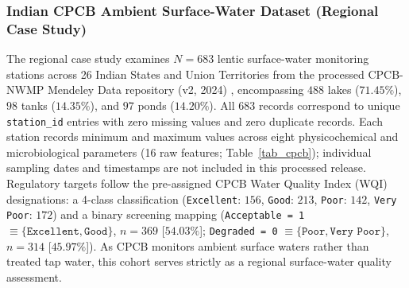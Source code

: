 \documentclass[pdflatex,sn-mathphys-num]{sn-jnl}%
\theoremstyle{thmstyleone}%
\theoremstyle{thmstyletwo}%
\theoremstyle{thmstylethree}%
\begin{document}
\subsubsection{Indian CPCB Ambient Surface-Water Dataset (Regional Case Study)}\label{subsubsec4_1_2}
The regional case study examines $N = 683$ lentic surface-water monitoring stations across 26 Indian States and Union Territories from the processed CPCB-NWMP Mendeley Data repository (v2, 2024) \cite{cpcb2024}, encompassing $488$ lakes ($71.45\%$), $98$ tanks ($14.35\%$), and $97$ ponds ($14.20\%$). All $683$ records correspond to unique \texttt{station\_id} entries with zero missing values and zero duplicate records. Each station records minimum and maximum values across eight physicochemical and microbiological parameters (16 raw features; Table~\ref{tab_cpcb}); individual sampling dates and timestamps are not included in this processed release. Regulatory targets follow the pre-assigned CPCB Water Quality Index (WQI) designations: a 4-class classification (\texttt{Excellent}: $156$, \texttt{Good}: $213$, \texttt{Poor}: $142$, \texttt{Very Poor}: $172$) and a binary screening mapping (\texttt{Acceptable = 1} $\equiv \{\texttt{Excellent}, \texttt{Good}\}$, $n = 369$ [$54.03\%$]; \texttt{Degraded = 0} $\equiv \{\texttt{Poor}, \texttt{Very Poor}\}$, $n = 314$ [$45.97\%$]). As CPCB monitors ambient surface waters rather than treated tap water, this cohort serves strictly as a regional surface-water quality assessment.
\end{document}
